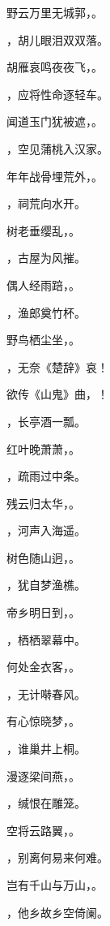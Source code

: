 \documentclass[12pt, a4paper, addpoints, answers]{exam}
\begin{document}
\begin{questions}
\question[3] 野云万里无城郭，\fillin 。

\question[3] \fillin ，胡儿眼泪双双落。

\question[3] 胡雁哀鸣夜夜飞，\fillin 。

\question[3] \fillin ，应将性命逐轻车。

\question[3] 闻道玉门犹被遮，\fillin 。

\question[3] \fillin ，空见蒲桃入汉家。

\question[3] 年年战骨埋荒外，\fillin 。

\question[3] \fillin ，祠荒向水开。

\question[3] 树老垂缨乱，\fillin 。

\question[3] \fillin ，古屋为风摧。

\question[3] 偶人经雨踣，\fillin 。

\question[3] \fillin ，渔郎奠竹杯。

\question[3] 野鸟栖尘坐，\fillin 。

\question[3] \fillin ，无奈《楚辞》哀！

\question[3] 欲传《山鬼》曲，\fillin ！

\question[3] \fillin ，长亭酒一瓢。

\question[3] 红叶晚萧萧，\fillin 。

\question[3] \fillin ，疏雨过中条。

\question[3] 残云归太华，\fillin 。

\question[3] \fillin ，河声入海遥。

\question[3] 树色随山迥，\fillin 。

\question[3] \fillin ，犹自梦渔樵。

\question[3] 帝乡明日到，\fillin 。

\question[3] \fillin ，栖栖翠幕中。

\question[3] 何处金衣客，\fillin 。

\question[3] \fillin ，无计啭春风。

\question[3] 有心惊晓梦，\fillin 。

\question[3] \fillin ，谁巢井上桐。

\question[3] 漫逐梁间燕，\fillin 。

\question[3] \fillin ，缄恨在雕笼。

\question[3] 空将云路翼，\fillin 。

\question[3] \fillin ，别离何易来何难。

\question[3] 岂有千山与万山，\fillin 。

\question[3] \fillin ，他乡故乡空倚阑。


\end{questions}
\end{document}

